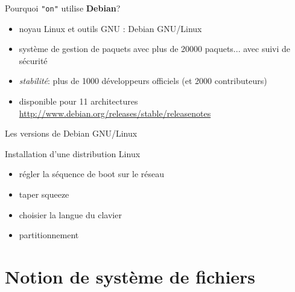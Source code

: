 \documentclass[french]{beamer}
\begin{document}
\begin{frame}
Pourquoi \texttt{"on"} utilise \textbf{Debian}?

\begin{itemize}
\item noyau Linux et outils GNU : Debian GNU/Linux
\item système de gestion de paquets avec plus de 20000 paquets... avec suivi de sécurité
\item \textit{stabilité}: plus de 1000 développeurs officiels (et 2000 contributeurs)
\item disponible pour 11 architectures \url{http://www.debian.org/releases/stable/releasenotes}
\end{itemize}
\end{frame}

\begin{frame}
Les versions de Debian GNU/Linux
\end{frame}


\begin{frame}
\begin{center}
Installation d'une distribution Linux
\begin{itemize}
\item régler la séquence de boot sur le réseau
\item taper squeeze
\item choisier la langue du clavier 
\item partitionnement
\end{itemize}
\end{center}
\end{frame}


\section{Notion de système de fichiers}
\frame{\tableofcontents[current]}
\end{document}
